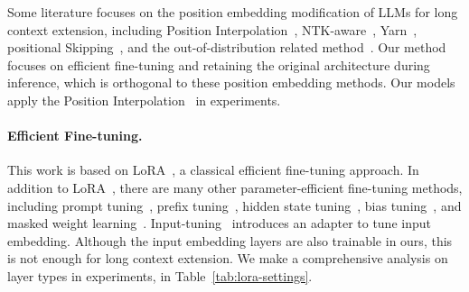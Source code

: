 \documentclass{article} %
\begin{document}
Some literature focuses on the position embedding modification of LLMs for long context extension, including Position Interpolation~\citep{position-interpolation}, NTK-aware~\citep{ntk-pe}, Yarn~\citep{yarn}, positional Skipping~\citep{zhu2023pose}, and the out-of-distribution related method~\citep{lm-infinite}. Our method focuses on efficient fine-tuning and retaining the original architecture during inference, which is orthogonal to these position embedding methods. Our models apply the Position Interpolation~\citep{position-interpolation} in experiments.

\paragraph{Efficient Fine-tuning.}
This work is based on LoRA~\citep{lora}, a classical efficient fine-tuning approach. In addition to LoRA~\citep{lora}, there are many other parameter-efficient fine-tuning methods, including prompt tuning~\citep{prompt-tuning}, prefix tuning~\citep{prefix-tuning}, hidden state tuning~\citep{ia-3}, bias tuning~\citep{bitfit}, and masked weight learning~\citep{fisher-mask}. Input-tuning~\citep{input-tuning} introduces an adapter to tune input embedding. Although the input embedding layers are also trainable in ours, this is not enough for long context extension. We make a comprehensive analysis on layer types in experiments, in Table~\ref{tab:lora-settings}.
\end{document}
